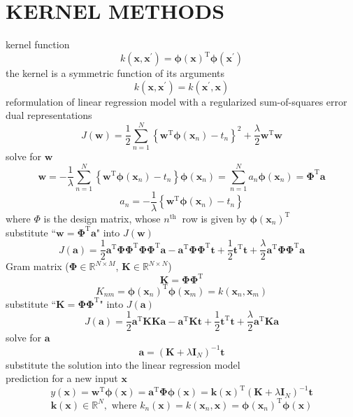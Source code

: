 \documentclass{article}
\begin{document}
	\section{KERNEL METHODS}
	kernel function
	$$
	k\left(\mathbf{x}, \mathbf{x}^{\prime}\right)=\boldsymbol{\phi}(\mathbf{x})^{\mathrm{T}} \boldsymbol{\phi}\left(\mathbf{x}^{\prime}\right)
	$$
	the kernel is a symmetric function of its arguments
	$$
	k\left(\mathbf{x}, \mathbf{x}^{\prime}\right)=k\left(\mathbf{x}^{\prime}, \mathbf{x}\right)
	$$
	reformulation of linear regression model with a regularized sum-of-squares error\\
	dual representations
	$$
	J(\mathbf{w})=\frac{1}{2} \sum_{n=1}^{N}\left\{\mathbf{w}^{\mathrm{T}} \boldsymbol{\phi}\left(\mathbf{x}_{n}\right)-t_{n}\right\}^{2}+\frac{\lambda}{2} \mathbf{w}^{\mathrm{T}} \mathbf{w}
	$$
	solve for $\mathbf{w}$
	$$
	\mathbf{w}=-\frac{1}{\lambda} \sum_{n=1}^{N}\left\{\mathbf{w}^{\mathrm{T}} \boldsymbol{\phi}\left(\mathbf{x}_{n}\right)-t_{n}\right\} \boldsymbol{\phi}\left(\mathbf{x}_{n}\right)=\sum_{n=1}^{N} a_{n} \boldsymbol{\phi}\left(\mathbf{x}_{n}\right)=\mathbf{\Phi}^{\mathrm{T}} \mathbf{a}
	$$
	$$
	a_{n}=-\frac{1}{\lambda}\left\{\mathbf{w}^{\mathrm{T}} \boldsymbol{\phi}\left(\mathbf{x}_{n}\right)-t_{n}\right\}
	$$
	where $\Phi$ is the design matrix, whose $n^{\text {th }}$ row is given by $\boldsymbol{\phi}\left(\mathbf{x}_{n}\right)^{\mathrm{T}}$\\
	substitute ``$\mathbf{w}=\boldsymbol{\Phi}^{\mathrm{T}} \mathbf{a}$" into $J(\mathbf{w})$
	$$
	J(\mathbf{a})=\frac{1}{2} \mathbf{a}^{\mathrm{T}} \boldsymbol{\Phi} \boldsymbol{\Phi}^{\mathrm{T}} \boldsymbol{\Phi} \boldsymbol{\Phi}^{\mathrm{T}} \mathbf{a}-\mathbf{a}^{\mathrm{T}} \boldsymbol{\Phi} \boldsymbol{\Phi}^{\mathrm{T}} \mathbf{t}+\frac{1}{2} \mathbf{t}^{\mathrm{T}} \mathbf{t}+\frac{\lambda}{2} \mathbf{a}^{\mathrm{T}} \boldsymbol{\Phi} \boldsymbol{\Phi}^{\mathrm{T}} \mathbf{a}
	$$
	Gram matrix ($\boldsymbol{\Phi} \in \mathbb{R}^{N\times M}$, $
	\mathbf{K} \in \mathbb{R}^{N\times N}$)
	$$
	\mathbf{K}=\boldsymbol{\Phi} \boldsymbol{\Phi}^{\mathrm{T}}
	$$
	$$
	K_{n m}=\boldsymbol{\phi}\left(\mathbf{x}_{n}\right)^{\mathrm{T}} \boldsymbol{\phi}\left(\mathbf{x}_{m}\right)=k\left(\mathbf{x}_{n}, \mathbf{x}_{m}\right)
	$$
	substitute ``$\mathbf{K}=\boldsymbol{\Phi} \boldsymbol{\Phi}^{\mathrm{T}}$" into $J(\mathbf{a})$
	$$
	J(\mathbf{a})=\frac{1}{2} \mathbf{a}^{\mathrm{T}} \mathbf{K K} \mathbf{a}-\mathbf{a}^{\mathrm{T}} \mathbf{K} \mathbf{t}+\frac{1}{2} \mathbf{t}^{\mathrm{T}} \mathbf{t}+\frac{\lambda}{2} \mathbf{a}^{\mathrm{T}} \mathbf{K} \mathbf{a}
	$$
	solve for $\mathbf{a}$
	$$
	\mathbf{a}=\left(\mathbf{K}+\lambda \mathbf{I}_{N}\right)^{-1} \mathbf{t}
	$$
	substitute the solution into the linear regression model\\
	prediction for a new input $\mathbf{x}$
	$$
	y(\mathbf{x})=\mathbf{w}^{\mathrm{T}} \boldsymbol{\phi}(\mathbf{x})=\mathbf{a}^{\mathrm{T}} \boldsymbol{\Phi} \boldsymbol{\phi}(\mathbf{x})=\mathbf{k}(\mathbf{x})^{\mathrm{T}}\left(\mathbf{K}+\lambda \mathbf{I}_{N}\right)^{-1} \mathbf{t}
	$$
	$$
	\mathbf{k}(\mathbf{x})\in \mathbb{R}^N, \text{ where } k_{n}(\mathbf{x})=k\left(\mathbf{x}_{n}, \mathbf{x}\right)=\boldsymbol{\phi}(\mathbf{x}_n)^{\mathrm{T}} \boldsymbol{\phi}\left(\mathbf{x}\right)
	$$
	
\end{document}
